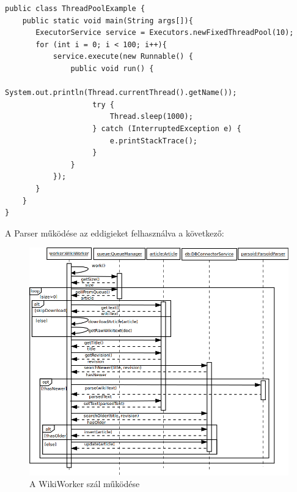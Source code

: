 \begin{lstlisting}[label={lst:threadpool}, caption=Példa a ThreadPool használatára,breaklines=true]
public class ThreadPoolExample {
    public static void main(String args[]){
       ExecutorService service = Executors.newFixedThreadPool(10);
       for (int i = 0; i < 100; i++){
           service.execute(new Runnable() {
        	   public void run() {
        		    System.out.println(Thread.currentThread().getName());
        			try {
						Thread.sleep(1000);
					} catch (InterruptedException e) {
						e.printStackTrace();
					}
        	   }   
           });
       }
    }
}
\end{lstlisting}

A Parser működése az eddigieket felhasználva a következő:

\begin{figure}[htp]
\centering
\includegraphics[scale=0.5]{img/sequence_parser2}
\caption{A WikiWorker szál működése}
\label{fig:sequence_parser2}
\end{figure}

